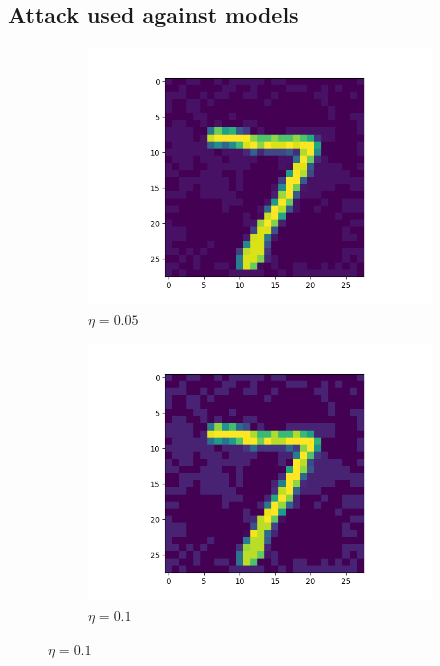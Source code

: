 \subsection{Attack used against models}

\begin{figure}
  \centering
  \begin{subfigure}{0.3\linewidth}
    \includegraphics[width=\linewidth]{adversarial-input-fc-100-100-10-005.png}
    \caption{$\eta = 0.05$}
  \end{subfigure}
  \begin{subfigure}{0.3\linewidth}
    \includegraphics[width=\linewidth]{adversarial-input-fc-100-100-10-01.png}
    \caption{$\eta = 0.1$}
  \end{subfigure}

\end{figure}
